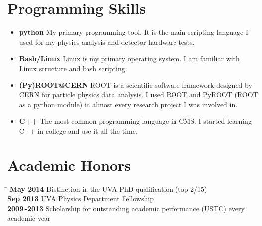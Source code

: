 \documentclass[10pt]{article} %
\begin{document}
\section{Programming Skills}
\begin{itemize}
\item
\textbf{python}
\small{
My primary programming tool. It is the main scripting language I used for my physics analysis and detector hardware tests.
}\\

\item
\textbf{Bash/Linux}
\small{
Linux is my primary operating system. I am familiar with Linux structure and bash scripting.
}

\item
\textbf{(Py)ROOT@CERN}
\small{
ROOT is a scientific software framework designed by CERN for particle physics data analysis. I used ROOT and PyROOT (ROOT as a python module) in almost every research project I was involved in.
}

\item
\textbf{C++}
\small{
The most common programming language in CMS. I started learning C++ in college and use it all the time. \\
}
\end{itemize}

\section{Academic Honors}
\begin{tabbing} %
\hspace{2cm} \= \kill
\textbf{May 2014} \> Distinction in the UVA PhD qualification (top 2/15) \\
\textbf{Sep 2013} \> UVA Physics Department Fellowship \\
\textbf{2009\,-2013} \> Scholarship for outstanding academic performance (USTC) every academic year \\
\end{tabbing}
\end{document}
